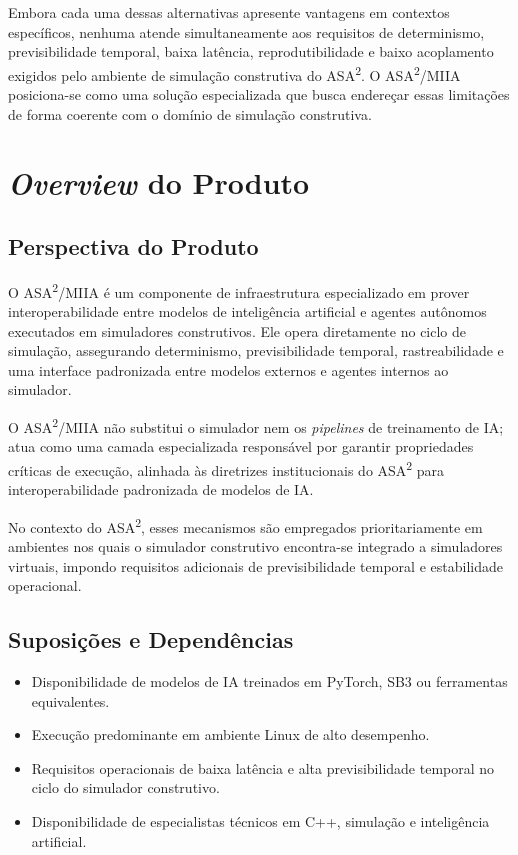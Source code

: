 Embora cada uma dessas alternativas apresente vantagens em contextos específicos, nenhuma atende simultaneamente aos requisitos de determinismo, previsibilidade temporal, baixa latência, reprodutibilidade e baixo acoplamento exigidos pelo ambiente de simulação construtiva do ASA\textsuperscript{2}. O ASA\textsuperscript{2}/MIIA posiciona-se como uma solução especializada que busca endereçar essas limitações de forma coerente com o domínio de simulação construtiva.

\section{\emph{Overview} do Produto}

\subsection{Perspectiva do Produto}

O ASA\textsuperscript{2}/MIIA é um componente de infraestrutura especializado em prover interoperabilidade entre modelos de inteligência artificial e agentes autônomos executados em simuladores construtivos. Ele opera diretamente no ciclo de simulação, assegurando determinismo, previsibilidade temporal, rastreabilidade e uma interface padronizada entre modelos externos e agentes internos ao simulador.

O ASA\textsuperscript{2}/MIIA não substitui o simulador nem os \emph{pipelines} de treinamento de IA; atua como uma camada especializada responsável por garantir propriedades críticas de execução, alinhada às diretrizes institucionais do ASA\textsuperscript{2} para interoperabilidade padronizada de modelos de IA.

No contexto do ASA\textsuperscript{2}, esses mecanismos são empregados prioritariamente em ambientes nos quais o simulador construtivo encontra-se integrado a simuladores virtuais, impondo requisitos adicionais de previsibilidade temporal e estabilidade operacional.

\subsection{Suposições e Dependências}

\begin{itemize}
    \item Disponibilidade de modelos de IA treinados em PyTorch, SB3 ou ferramentas equivalentes.
    \item Execução predominante em ambiente Linux de alto desempenho.
    \item Requisitos operacionais de baixa latência e alta previsibilidade temporal no ciclo do simulador construtivo.
    \item Disponibilidade de especialistas técnicos em C++, simulação e inteligência artificial.
\end{itemize}

